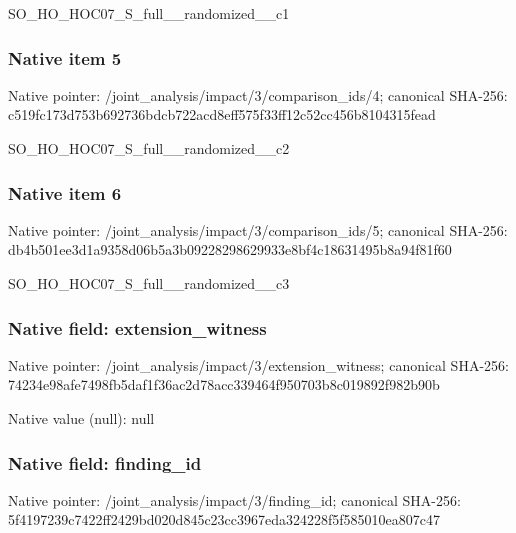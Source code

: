 \documentclass[10pt,a4paper]{article}
\begin{document}
\begingroup\raggedright\sloppy SO\_\allowbreak{}HO\_\allowbreak{}HOC07\_\allowbreak{}S\_\allowbreak{}full\_\allowbreak{}\_\allowbreak{}randomized\_\allowbreak{}\_\allowbreak{}c1\par\endgroup

\subsubsection{Native item 5}
Native pointer: /joint\_\allowbreak{}analysis/impact/3/comparison\_\allowbreak{}ids/4; canonical SHA-256: c519fc173d753b692736bdcb722acd8eff575f33ff12c52cc456b8104315fead

\begingroup\raggedright\sloppy SO\_\allowbreak{}HO\_\allowbreak{}HOC07\_\allowbreak{}S\_\allowbreak{}full\_\allowbreak{}\_\allowbreak{}randomized\_\allowbreak{}\_\allowbreak{}c2\par\endgroup

\subsubsection{Native item 6}
Native pointer: /joint\_\allowbreak{}analysis/impact/3/comparison\_\allowbreak{}ids/5; canonical SHA-256: db4b501ee3d1a9358d06b5a3b09228298629933e8bf4c18631495b8a94f81f60

\begingroup\raggedright\sloppy SO\_\allowbreak{}HO\_\allowbreak{}HOC07\_\allowbreak{}S\_\allowbreak{}full\_\allowbreak{}\_\allowbreak{}randomized\_\allowbreak{}\_\allowbreak{}c3\par\endgroup

\subsubsection{Native field: extension\_\allowbreak{}witness}
Native pointer: /joint\_\allowbreak{}analysis/impact/3/extension\_\allowbreak{}witness; canonical SHA-256: 74234e98afe7498fb5daf1f36ac2d78acc339464f950703b8c019892f982b90b

Native value (null): null

\subsubsection{Native field: finding\_\allowbreak{}id}
Native pointer: /joint\_\allowbreak{}analysis/impact/3/finding\_\allowbreak{}id; canonical SHA-256: 5f4197239c7422ff2429bd020d845c23cc3967eda324228f5f585010ea807c47
\end{document}
